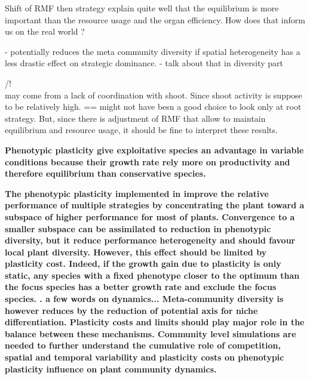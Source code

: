 Shift of RMF then strategy explain quite well that the equilibrium is more important than the resource usage and the organ efficiency. How does that inform us on the real world ?

 - potentially reduces the meta community diversity if spatial heterogeneity has a less drastic effect on strategic dominance. - talk about that in diversity part

/!\\ may come from a lack of coordination with shoot. Since shoot activity is suppose to be relatively high. == might not have besn a good choice to look only at root strategy. But, since there is adjustment of RMF that allow to maintain equilibrium and resource usage, it should be fine to interpret these results.

\textbf{Phenotypic plasticity give exploitative species an advantage in variable conditions because their growth rate rely more on productivity and therefore equilibrium than conservative species. }

%




\textbf{The phenotypic plasticity implemented in \model improve the relative performance of multiple strategies by concentrating the plant toward a subspace of higher performance for most of plants. Convergence to a smaller subspace can be assimilated to reduction in phenotypic diversity, but it reduce performance heterogeneity and should favour local plant diversity. However, this effect should be limited by plasticity cost. Indeed, if the growth gain due to plasticity is only static, any species with a fixed phenotype closer to the optimum than the focus species has a better growth rate and exclude the focus species.
. a few words on dynamics... Meta-community diversity is however reduces by the reduction of potential axis for niche differentiation. Plasticity costs and limits should play major role in the balance between these mechanisms. Community level simulations are needed to further understand the cumulative role of competition, spatial and temporal variability and plasticity costs on phenotypic plasticity influence on plant community dynamics.}


